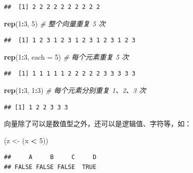 \documentclass[
  b5paper,
  UTF8,twoside]{book}
\newenvironment{Shaded}{\begin{snugshade}}{\end{snugshade}}
\newcommand{\AttributeTok}[1]{\textcolor[rgb]{0.13,0.29,0.53}{#1}}
\newcommand{\CommentTok}[1]{\textcolor[rgb]{0.56,0.35,0.01}{\textit{#1}}}
\newcommand{\DecValTok}[1]{\textcolor[rgb]{0.00,0.00,0.81}{#1}}
\newcommand{\FunctionTok}[1]{\textcolor[rgb]{0.13,0.29,0.53}{\textbf{#1}}}
\newcommand{\NormalTok}[1]{#1}
\newcommand{\OtherTok}[1]{\textcolor[rgb]{0.56,0.35,0.01}{#1}}
\newcommand{\SpecialCharTok}[1]{\textcolor[rgb]{0.81,0.36,0.00}{\textbf{#1}}}
\begin{document}
\begin{verbatim}
##  [1] 2 2 2 2 2 2 2 2 2 2
\end{verbatim}

\begin{Shaded}
\begin{Highlighting}[]
\FunctionTok{rep}\NormalTok{(}\DecValTok{1}\SpecialCharTok{:}\DecValTok{3}\NormalTok{, }\DecValTok{5}\NormalTok{) }\CommentTok{\# 整个向量重复 5 次}
\end{Highlighting}
\end{Shaded}

\begin{verbatim}
##  [1] 1 2 3 1 2 3 1 2 3 1 2 3 1 2 3
\end{verbatim}

\begin{Shaded}
\begin{Highlighting}[]
\FunctionTok{rep}\NormalTok{(}\DecValTok{1}\SpecialCharTok{:}\DecValTok{3}\NormalTok{, }\AttributeTok{each =} \DecValTok{5}\NormalTok{) }\CommentTok{\# 每个元素重复 5 次}
\end{Highlighting}
\end{Shaded}

\begin{verbatim}
##  [1] 1 1 1 1 1 2 2 2 2 2 3 3 3 3 3
\end{verbatim}

\begin{Shaded}
\begin{Highlighting}[]
\FunctionTok{rep}\NormalTok{(}\DecValTok{1}\SpecialCharTok{:}\DecValTok{3}\NormalTok{, }\DecValTok{1}\SpecialCharTok{:}\DecValTok{3}\NormalTok{) }\CommentTok{\# 每个元素分别重复 1、2、3 次}
\end{Highlighting}
\end{Shaded}

\begin{verbatim}
## [1] 1 2 2 3 3 3
\end{verbatim}

向量除了可以是数值型之外，还可以是逻辑值、字符等，如：

\begin{Shaded}
\begin{Highlighting}[]
\NormalTok{(z }\OtherTok{\textless{}{-}}\NormalTok{ (x }\SpecialCharTok{\textless{}} \DecValTok{5}\NormalTok{))}
\end{Highlighting}
\end{Shaded}

\begin{verbatim}
##     A     B     C     D 
## FALSE FALSE FALSE  TRUE
\end{verbatim}
\end{document}
